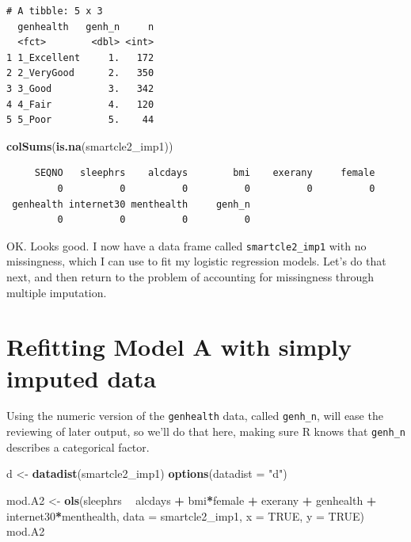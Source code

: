 \documentclass[]{book}
\newenvironment{Shaded}{\begin{snugshade}}{\end{snugshade}}
\newcommand{\KeywordTok}[1]{\textcolor[rgb]{0.13,0.29,0.53}{\textbf{#1}}}
\newcommand{\DataTypeTok}[1]{\textcolor[rgb]{0.13,0.29,0.53}{#1}}
\newcommand{\StringTok}[1]{\textcolor[rgb]{0.31,0.60,0.02}{#1}}
\newcommand{\OtherTok}[1]{\textcolor[rgb]{0.56,0.35,0.01}{#1}}
\newcommand{\OperatorTok}[1]{\textcolor[rgb]{0.81,0.36,0.00}{\textbf{#1}}}
\newcommand{\NormalTok}[1]{#1}
\theoremstyle{definition}
\theoremstyle{definition}
\theoremstyle{definition}
\theoremstyle{remark}
\begin{document}
\begin{verbatim}
# A tibble: 5 x 3
  genhealth   genh_n     n
  <fct>        <dbl> <int>
1 1_Excellent     1.   172
2 2_VeryGood      2.   350
3 3_Good          3.   342
4 4_Fair          4.   120
5 5_Poor          5.    44
\end{verbatim}

\begin{Shaded}
\begin{Highlighting}[]
\KeywordTok{colSums}\NormalTok{(}\KeywordTok{is.na}\NormalTok{(smartcle2_imp1))}
\end{Highlighting}
\end{Shaded}

\begin{verbatim}
     SEQNO   sleephrs    alcdays        bmi    exerany     female 
         0          0          0          0          0          0 
 genhealth internet30 menthealth     genh_n 
         0          0          0          0 
\end{verbatim}

OK. Looks good. I now have a data frame called \texttt{smartcle2\_imp1}
with no missingness, which I can use to fit my logistic regression
models. Let's do that next, and then return to the problem of accounting
for missingness through multiple imputation.

\section{Refitting Model A with simply imputed
data}\label{refitting-model-a-with-simply-imputed-data}

Using the numeric version of the \texttt{genhealth} data, called
\texttt{genh\_n}, will ease the reviewing of later output, so we'll do
that here, making sure R knows that \texttt{genh\_n} describes a
categorical factor.

\begin{Shaded}
\begin{Highlighting}[]
\NormalTok{d <-}\StringTok{ }\KeywordTok{datadist}\NormalTok{(smartcle2_imp1)}
\KeywordTok{options}\NormalTok{(}\DataTypeTok{datadist =} \StringTok{"d"}\NormalTok{)}

\NormalTok{mod.A2 <-}\StringTok{ }\KeywordTok{ols}\NormalTok{(sleephrs }\OperatorTok{~}\StringTok{ }\NormalTok{alcdays }\OperatorTok{+}\StringTok{ }\NormalTok{bmi}\OperatorTok{*}\NormalTok{female }\OperatorTok{+}\StringTok{ }\NormalTok{exerany }\OperatorTok{+}\StringTok{ }
\StringTok{                  }\NormalTok{genhealth }\OperatorTok{+}\StringTok{ }\NormalTok{internet30}\OperatorTok{*}\NormalTok{menthealth, }
              \DataTypeTok{data =}\NormalTok{ smartcle2_imp1, }\DataTypeTok{x =} \OtherTok{TRUE}\NormalTok{, }\DataTypeTok{y =} \OtherTok{TRUE}\NormalTok{)}
\NormalTok{mod.A2}
\end{Highlighting}
\end{Shaded}
\end{document}
